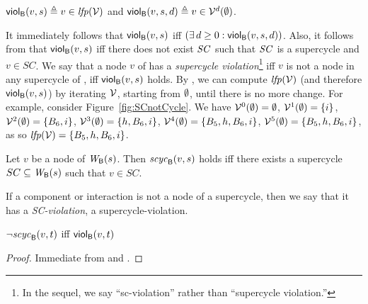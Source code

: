 \begin{definition}
\label{def:supercycle-violation}
\label{def:supercycle.violation}
\label{defn:supercycle.violation}
$\scV{v}{s} \df v \in \lfp{\VFs}$ and 
$\scVd{v}{d}{s} \df v \in \VFs^{d} (\ewfg)$.
\end{definition}
%
It immediately follows that $\scV{v}{s}$ iff  $(\ex d \ge 0: \scVd{v}{d}{s})$.
Also, it follows from  that $\scV{v}{s}$ iff there does not exist $\SC$ such that $\SC$ is a supercycle and $v \in SC$.
We say that a node $v$ of  has a \emph{supercycle violation}\footnote{In the sequel, we say ``sc-violation'' rather than ``supercycle violation.''} iff $v$ is not a node in any supercycle of , 
\ie iff $\scV{v}{s}$ holds. 
By , we can compute $\lfp{\VFs}$ (and therefore $\scV{v}{s}$) by iterating $\VFs$, starting from $\ewfg$, until there is no more change.
%
For example, consider Figure~\ref{fig:SCnotCycle}. We have 
$\VFs^{0} (\ewfg) = \ewfg$,
$\VFs^{1} (\ewfg) = \set{i}$, 
$\VFs^{2} (\ewfg) = \set{B_6, i}$, 
$\VFs^{3} (\ewfg) = \set{h, B_6, i}$, 
$\VFs^{4} (\ewfg) = \set{B_5, h, B_6, i}$, 
$\VFs^{5} (\ewfg) = \set{B_5, h, B_6, i}$, 
as so $\lfp{\VFs} = \set{B_5, h, B_6, i}$.





\begin{definition}
\label{defn:supercycle.membership}
Let $v$ be a node of $\wfg{\B}{s}$. Then
$\scyc{\B}{s}{v}$ holds iff there exists a supercycle $SC \sub
\wfg{\B}{s}$ such that $v \in SC$. 
\end{definition}

If a component or interaction is not a node of a supercycle, then we say that it has a
\emph{SC-violation}, \ie a supercycle-violation.
%



\begin{proposition} \label{prop:scViol-iff-notInSC}
$\neg \scyc{\B}{t}{v}$ iff $\scV{v}{t}$ %
\end{proposition}
%
\begin{proof}
Immediate from  and .
\end{proof}

